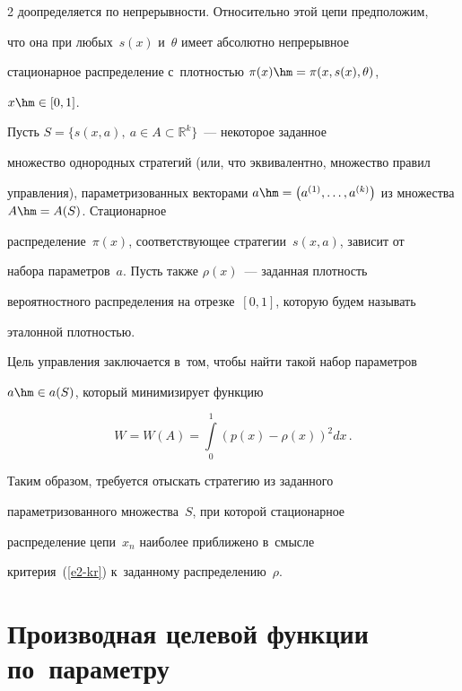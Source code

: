 \begin{multicols}{2}
доопределяется по не\-пре\-рыв\-ности. Относительно этой цепи предположим, 


что она при любых~$s(x)$ и~$\theta$ имеет абсолютно непрерывное 


стационарное распределение с~плот\-ностью $\pi(x)\hm= \pi(x,s(x),\theta)$, 


$x\hm\in [0,1]$.





  Пусть $S=\{s(x,a),\ a\in A\subset \mathbb{R}^k\}$~--- некоторое заданное 


множество однородных стратегий (или, что эквивалентно, множество правил 


управления), па\-ра\-мет\-ри\-зо\-ван\-ных векторами $a\hm= \left( a^{(1)}, \ldots , 


a^{(k)}\right)$ из множества $A\hm= A(S)$. Стационарное 


распределение~$\pi(x)$, соответствующее стратегии~$s(x,a)$, зависит от 


набора па\-ра\-мет\-ров~$a$. Пусть также $\rho(x)$~--- заданная плот\-ность 


вероятностного распределения на отрезке~$[0,1]$, которую будем называть 


эталонной плот\-ностью.


  


  Цель управления заключается в~том, чтобы \mbox{найти} такой набор па\-ра\-мет\-ров 


$a\hm\in a(S)$, который минимизирует функцию


  \begin{equation}


  W=W(A)=\int\limits_0^{1} \left( p(x)-\rho(x)\right)^2dx\,.


  \label{e2-kr}


  \end{equation}


  


  Таким образом, требуется отыскать стратегию из заданного 


параметризованного множества~$S$, при которой стационарное 


распределение цепи~$x_n$ наиболее при\-бли\-же\-но в~смыс\-ле 


критерия~(\ref{e2-kr}) к~заданному распределению~$\rho$.


  


  \section{Производная целевой функции по~параметру}



\end{multicols}
